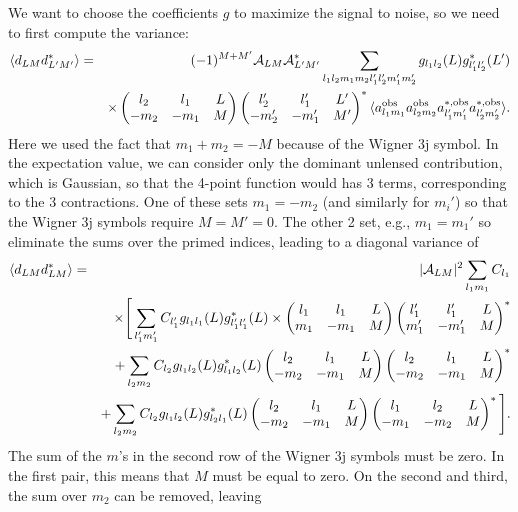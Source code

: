 \documentclass[prd,amsmath,amssymb,floatfix,superscriptaddress,nofootinbib,preprintnumbers]{revtex4-1}
\def\bea{\begin{eqnarray}}
\def\eea{\end{eqnarray}}
\newcommand{\vs}{\nonumber\\}
\begin{document}
 We want to choose the coefficients $g$ to maximize the signal to noise, so we need to first compute the variance:
 \bea
 \langle d_{LM} d^*_{L'M'} \rangle &=& (-1)^{M+M'}  \mathcal{A}_{LM}\mathcal{A}^*_{L'M'} \sum_{l_1l_2m_1m_2 l_1'l_2'm_1'm_2'} g_{l_1l_2}(L)  g^*_{l_1'l_2'}(L') \vs
 &&\times \left(\begin{matrix} l_2 & l_1 &L\cr -m_2&-m_1&M\end{matrix}\right)
 \left(\begin{matrix} l_2' & l_1' &L'\cr -m_2'&-m_1'&M'\end{matrix}\right)^*
 \langle a^{\rm obs}_{l_1m_1} a^{\rm obs}_{l_2m_2}  a^{*,\rm obs}_{l_1'm_1'} a^{*,\rm obs}_{l_2'm_2'} \rangle.
 \eea
 Here we used the fact that $m_1+m_2=-M$ because of the Wigner 3j symbol. In the expectation value, we can consider only the dominant unlensed contribution, which is Gaussian, so that the 4-point function would has 3 terms, corresponding to the 3 contractions. One of these sets $m_1=-m_2$ (and similarly for $m_i'$) so that the Wigner 3j symbols require $M=M'=0$. The other 2 set, e.g., $m_1=m_1'$ so eliminate the sums over the primed indices, leading to a diagonal variance of
 \bea
 \langle d_{LM} d^*_{LM} \rangle &=& \vert \mathcal{A}_{LM}\vert^2
 \sum_{l_1m_1} C_{l_1}
 \vs
 &&\times 
\Bigg[ \sum_{ l_1'm_1'}  C_{l_1'} g_{l_1l_1}(L)  g^*_{l_1'l_1'}(L) 
\times \left(\begin{matrix} l_1 & l_1 &L\cr m_1&-m_1&M\end{matrix}\right)
 \left(\begin{matrix} l_1' & l_1' &L\cr m_1'&-m_1'&M\end{matrix}\right)^*\vs
 &&+ \sum_{l_2m_2}  C_{l_2}  g_{l_1l_2}(L)  g^*_{l_1l_2}(L)  \left(\begin{matrix} l_2 & l_1 &L\cr -m_2&-m_1&M\end{matrix}\right)
 \left(\begin{matrix} l_2 & l_1 &L\cr -m_2&-m_1&M\end{matrix}\right)^* 
 \vs
 &&+ \sum_{l_2m_2}  C_{l_2} g_{l_1l_2}(L)  g^*_{l_2l_1}(L)  \left(\begin{matrix} l_2 & l_1 &L\cr -m_2&-m_1&M\end{matrix}\right)
 \left(\begin{matrix} l_1 & l_2 &L\cr -m_1&-m_2&M\end{matrix}\right)^* 
 \Bigg].
  \eea 
  The sum of the $m$'s in the second row of the Wigner 3j symbols must be zero. In the first pair, this means that $M$ must be equal to zero. On the second and third, the sum over $m_2$ can be removed, leaving
\end{document}
